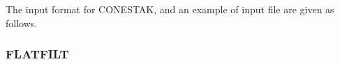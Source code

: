 \documentclass[12pt,twoside]{article}
\begin{document}
\clearpage

The input format for CONESTAK, and an example of input file are given as follows.

\begin{small}

\end{small}

\clearpage

\subsubsection{FLATFILT}
\renewcommand{\rightmark}{FLATFILT CM}
\end{document}
